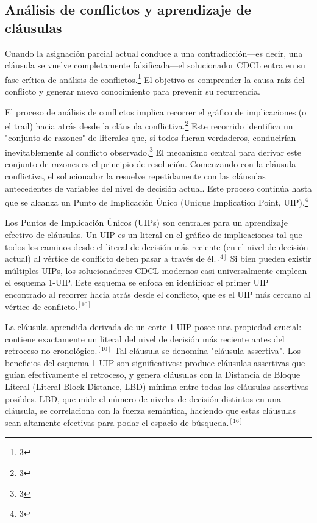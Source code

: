 \documentclass{article}
\begin{document}
\subsection{Análisis de conflictos y aprendizaje de cláusulas}

Cuando la asignación parcial actual conduce a una contradicción—es decir, una cláusula se vuelve completamente falsificada—el solucionador CDCL entra en su fase crítica de análisis de conflictos.\footnote{3} El objetivo es comprender la causa raíz del conflicto y generar nuevo conocimiento para prevenir su recurrencia.

El proceso de análisis de conflictos implica recorrer el gráfico de implicaciones (o el trail) hacia atrás desde la cláusula conflictiva.\footnote{3} Este recorrido identifica un "conjunto de razones" de literales que, si todos fueran verdaderos, conducirían inevitablemente al conflicto observado.\footnote{3} El mecanismo central para derivar este conjunto de razones es el principio de resolución. Comenzando con la cláusula conflictiva, el solucionador la resuelve repetidamente con las cláusulas antecedentes de variables del nivel de decisión actual. Este proceso continúa hasta que se alcanza un Punto de Implicación Único (Unique Implication Point, UIP).\footnote{3}

Los Puntos de Implicación Únicos (UIPs) son centrales para un aprendizaje efectivo de cláusulas. Un UIP es un literal en el gráfico de implicaciones tal que todos los caminos desde el literal de decisión más reciente (en el nivel de decisión actual) al vértice de conflicto deben pasar a través de él.$^{[4]}$ Si bien pueden existir múltiples UIPs, los solucionadores CDCL modernos casi universalmente emplean el esquema 1-UIP. Este esquema se enfoca en identificar el primer UIP encontrado al recorrer hacia atrás desde el conflicto, que es el UIP más cercano al vértice de conflicto.$^{[10]}$

La cláusula aprendida derivada de un corte 1-UIP posee una propiedad crucial: contiene exactamente un literal del nivel de decisión más reciente antes del retroceso no cronológico.$^{[10]}$ Tal cláusula se denomina "cláusula assertiva". Los beneficios del esquema 1-UIP son significativos: produce cláusulas assertivas que guían efectivamente el retroceso, y genera cláusulas con la Distancia de Bloque Literal (Literal Block Distance, LBD) mínima entre todas las cláusulas assertivas posibles. LBD, que mide el número de niveles de decisión distintos en una cláusula, se correlaciona con la fuerza semántica, haciendo que estas cláusulas sean altamente efectivas para podar el espacio de búsqueda.$^{[16]}$
\end{document}
